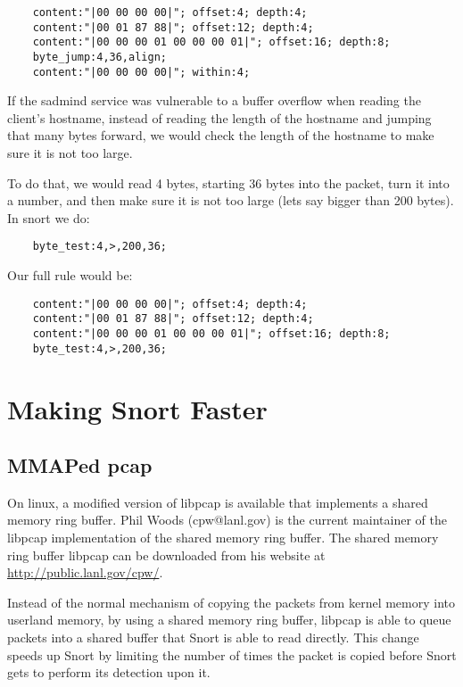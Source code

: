 \documentclass[english]{report}
\begin{document}
\begin{verbatim}
    content:"|00 00 00 00|"; offset:4; depth:4;
    content:"|00 01 87 88|"; offset:12; depth:4;
    content:"|00 00 00 01 00 00 00 01|"; offset:16; depth:8;
    byte_jump:4,36,align;
    content:"|00 00 00 00|"; within:4;
\end{verbatim}

If the sadmind service was vulnerable to a buffer overflow when reading the
client's hostname, instead of reading the length of the hostname and jumping
that many bytes forward, we would check the length of the hostname to make sure
it is not too large.

To do that, we would read 4 bytes, starting 36 bytes into the packet, turn it
into a number, and then make sure it is not too large (lets say bigger than 200
bytes).  In snort we do:

\begin{verbatim}
    byte_test:4,>,200,36;
\end{verbatim}
    
Our full rule would be:

\begin{verbatim}
    content:"|00 00 00 00|"; offset:4; depth:4;
    content:"|00 01 87 88|"; offset:12; depth:4;
    content:"|00 00 00 01 00 00 00 01|"; offset:16; depth:8;
    byte_test:4,>,200,36;
\end{verbatim}

\newpage
\chapter{Making Snort Faster}

\section{MMAPed pcap}

On linux, a modified version of libpcap is available that implements a shared memory ring buffer.  Phil Woods (cpw@lanl.gov) is the current maintainer of the libpcap implementation of the shared memory ring buffer.  The shared memory ring buffer libpcap can be downloaded from his website at \url{http://public.lanl.gov/cpw/}.

Instead of the normal mechanism of copying the packets from kernel memory into userland memory, by using a shared memory ring buffer, libpcap is able to queue packets into a shared buffer that Snort is able to read directly.  This change speeds up Snort by limiting the number of times the packet is copied before Snort gets to perform its detection upon it.
\end{document}
